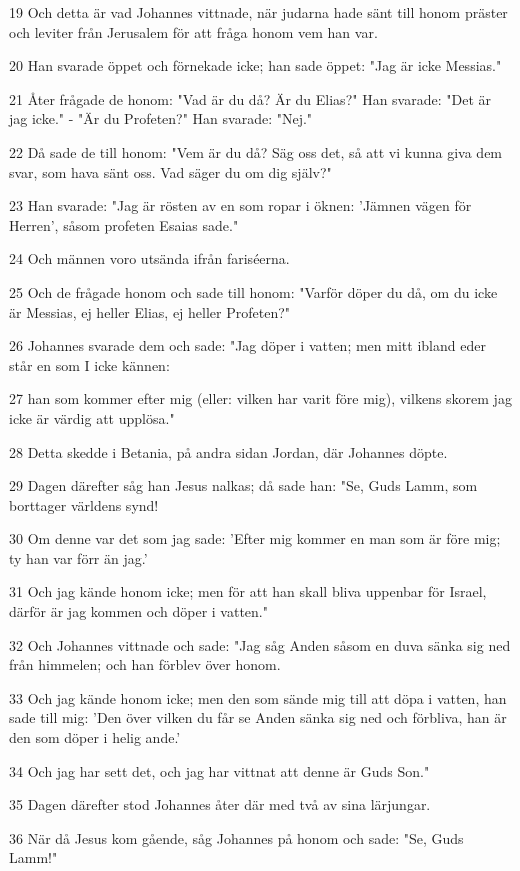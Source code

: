\par 19 Och detta är vad Johannes vittnade, när judarna hade sänt till honom präster och leviter från Jerusalem för att fråga honom vem han var.
\par 20 Han svarade öppet och förnekade icke; han sade öppet: "Jag är icke Messias."
\par 21 Åter frågade de honom: "Vad är du då? Är du Elias?" Han svarade: "Det är jag icke." - "Är du Profeten?" Han svarade: "Nej."
\par 22 Då sade de till honom: "Vem är du då? Säg oss det, så att vi kunna giva dem svar, som hava sänt oss. Vad säger du om dig själv?"
\par 23 Han svarade: "Jag är rösten av en som ropar i öknen: 'Jämnen vägen för Herren', såsom profeten Esaias sade."
\par 24 Och männen voro utsända ifrån fariséerna.
\par 25 Och de frågade honom och sade till honom: "Varför döper du då, om du icke är Messias, ej heller Elias, ej heller Profeten?"
\par 26 Johannes svarade dem och sade: "Jag döper i vatten; men mitt ibland eder står en som I icke kännen:
\par 27 han som kommer efter mig (eller: vilken har varit före mig), vilkens skorem jag icke är värdig att upplösa."
\par 28 Detta skedde i Betania, på andra sidan Jordan, där Johannes döpte.
\par 29 Dagen därefter såg han Jesus nalkas; då sade han: "Se, Guds Lamm, som borttager världens synd!
\par 30 Om denne var det som jag sade: 'Efter mig kommer en man som är före mig; ty han var förr än jag.'
\par 31 Och jag kände honom icke; men för att han skall bliva uppenbar för Israel, därför är jag kommen och döper i vatten."
\par 32 Och Johannes vittnade och sade: "Jag såg Anden såsom en duva sänka sig ned från himmelen; och han förblev över honom.
\par 33 Och jag kände honom icke; men den som sände mig till att döpa i vatten, han sade till mig: 'Den över vilken du får se Anden sänka sig ned och förbliva, han är den som döper i helig ande.'
\par 34 Och jag har sett det, och jag har vittnat att denne är Guds Son."
\par 35 Dagen därefter stod Johannes åter där med två av sina lärjungar.
\par 36 När då Jesus kom gående, såg Johannes på honom och sade: "Se, Guds Lamm!"
